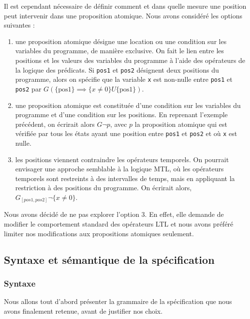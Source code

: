 Il est cependant nécessaire de définir comment et dans quelle mesure une
position peut intervenir dans une proposition atomique. Nous avons
considéré les options suivantes :

\begin{enumerate}
\def\labelenumi{\arabic{enumi})}
\item
  une proposition atomique désigne une location ou une condition sur les
  variables du programme, de manière exclusive. On fait le lien entre les
  positions et les valeurs des variables du programme à l'aide des opérateurs de
  la logique des prédicats. Si \texttt{pos1} et \texttt{pos2} désignent
  deux positions du programme, alors on spécifie que la variable \texttt{x}
  est non-nulle entre \texttt{pos1} et \texttt{pos2} par \(G
  (\{\text{pos1}\}\implies \{x \neq 0\} U \{\text{pos1}\})\).
\item
  une proposition atomique est constituée d'une condition sur les variables du
  programme et d'une condition sur les positions. En reprenant l'exemple
  précédent, on écrirait alors \(G \lnot p\), avec \(p\) la proposition atomique
  qui est vérifiée par tous les états ayant une position entre \texttt{pos1}
  et \texttt{pos2} et où \texttt{x} est nulle.
\item
  les positions viennent contraindre les opérateurs temporels. On pourrait
  envisager une approche semblable à la logique MTL\cite{mtl_definition}, où les
  opérateurs temporels sont restreints à des intervalles de temps, mais en
  appliquant la restriction à des positions du programme. On écrirait alors,
  \(G_{[pos1, pos2]} \lnot \{ x \neq 0 \}\).
\end{enumerate}

Nous avons décidé de ne pas explorer l'option 3. En effet, elle demande
de modifier le comportement standard des opérateurs LTL et nous avons
préféré limiter nos modifications aux propositions atomiques seulement.

\subsection{Syntaxe et sémantique de la spécification}

\subsubsection{Syntaxe}

Nous allons tout d'abord présenter la grammaire de la spécification que
nous avons finalement retenue, avant de justifier nos choix.

